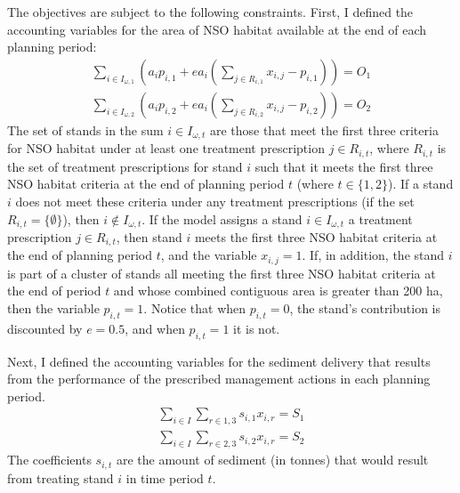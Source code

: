 The objectives are subject to the following constraints. First, I defined the accounting variables for the area of NSO habitat available at the end of each planning period:
\begin{align}
\sum_{i\in I_{\omega,1}} \left(a_i p_{i,1} + e a_i \left( \sum_{j \in R_{i,1}} x_{i,j}-p_{i,1} \right) \right) = O_1 \label{eqn:constraintOwl1}\\
\sum_{i\in I_{\omega,2}} \left(a_i p_{i,2} + e a_i \left( \sum_{j \in R_{i,2}} x_{i,j}-p_{i,2} \right) \right) = O_2 \label{eqn:constraintOwl2}
\end{align}
The set of stands in the sum $i \in I_{\omega,t}$ are those that meet the first three criteria for NSO habitat under at least one treatment prescription $j \in R_{i,t}$, where $R_{i,t}$ is the set of treatment prescriptions for stand $i$ such that it meets the first three NSO habitat criteria at the end of planning period $t$ (where $t \in \{1,2\}$). If a stand $i$ does not meet these criteria under any treatment prescriptions (if the set $R_{i,t} = \{\emptyset\}$), then $i \notin I_{\omega,t}$. If the model assigns a stand $i \in I_{\omega,t}$ a treatment prescription $j \in R_{i,t}$, then stand $i$ meets the first three NSO habitat criteria at the end of planning period $t$, and the variable $x_{i,j}=1$. If, in addition, the stand $i$ is part of a cluster of stands all meeting the first three NSO habitat criteria at the end of period $t$ and whose combined contiguous area is greater than 200 ha, then the variable $p_{i,t} = 1$. Notice that when $p_{i,t} = 0$, the stand's contribution is discounted by $e = 0.5$, and when $p_{i,t} = 1$ it is not.

Next, I defined the accounting variables for the sediment delivery that results from the performance of the prescribed management actions in each planning period.
\begin{align}
\sum_{i\in I} \sum_{r\in 1,3} s_{i,1} x_{i,r} = S_1 \label{eqn:constraintSediment1}\\
\sum_{i\in I} \sum_{r\in 2,3} s_{i,2} x_{i,r} = S_2 \label{eqn:constraintSediment2}
\end{align}
The coefficients $s_{i,t}$ are the amount of sediment (in tonnes) that would result from treating stand $i$ in time period $t$.

